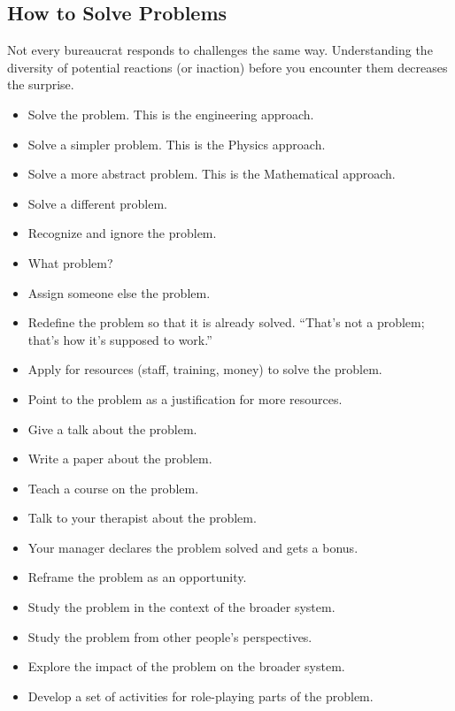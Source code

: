 \subsection*{How to Solve Problems}


Not every bureaucrat responds to challenges the same way. Understanding the diversity of potential reactions (or inaction) before you encounter them decreases the surprise. 

\begin{itemize}
    \item Solve the problem. This is the engineering approach.
    \item Solve a simpler problem. This is the Physics approach.
    \item Solve a more abstract problem. This is the Mathematical approach.
    \item Solve a different problem.
    \item Recognize and ignore the problem. 
    \item What problem?
    \item Assign someone else the problem.
    \item Redefine the problem so that it is already solved. ``That's not a problem; that's how it's supposed to work.''
    \item Apply for resources (staff, training, money) to solve the problem.
    \item Point to the problem as a justification for more resources.
    \item Give a talk about the problem.
    \item Write a paper about the problem.
    \item Teach a course on the problem.
    \item Talk to your therapist about the problem.
    \item Your manager declares the problem solved and gets a bonus.
    \item Reframe the problem as an opportunity. 
    \item Study the problem in the context of the broader system.
    \item Study the problem from other people's perspectives.
    \item Explore the impact of the problem on the broader system.
    \item Develop a set of activities for role-playing parts of the problem. 

\end{itemize}
